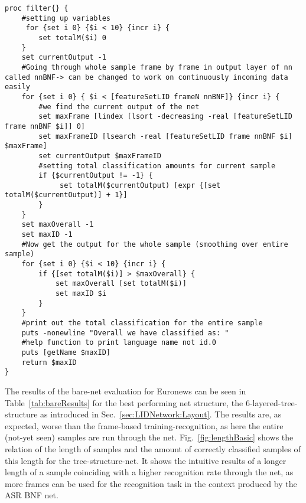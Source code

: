 \begin{lstlisting}[label=lst:basic,caption=Most basic filter employed to smooth output]
proc filter{} {
    #setting up variables
     for {set i 0} {$i < 10} {incr i} {
        set totalM($i) 0
    }
    set currentOutput -1
    #Going through whole sample frame by frame in output layer of nn called nnBNF-> can be changed to work on continuously incoming data easily
    for {set i 0} { $i < [featureSetLID frameN nnBNF]} {incr i} {
        #we find the current output of the net
        set maxFrame [lindex [lsort -decreasing -real [featureSetLID frame nnBNF $i]] 0]
        set maxFrameID [lsearch -real [featureSetLID frame nnBNF $i] $maxFrame]
        set currentOutput $maxFrameID
        #setting total classification amounts for current sample
        if {$currentOutput != -1} {
             set totalM($currentOutput) [expr {[set totalM($currentOutput)] + 1}]
        }
    }
    set maxOverall -1
    set maxID -1
    #Now get the output for the whole sample (smoothing over entire sample)
    for {set i 0} {$i < 10} {incr i} {
        if {[set totalM($i)] > $maxOverall} {
            set maxOverall [set totalM($i)]
            set maxID $i
        }
    }
    #print out the total classification for the entire sample
    puts -nonewline "Overall we have classified as: "
    #help function to print language name not id.0
    puts [getName $maxID]
    return $maxID
}
\end{lstlisting}


The results of the bare-net evaluation for Euronews can be seen in Table~\ref{tab:bareResults} for the best performing net structure, the 6-layered-tree-structure as introduced in Sec.~\ref{sec:LIDNetwork:Layout}. The results are, as expected, worse than the frame-based training-recognition, as here the entire (not-yet seen) samples are run through the net.  Fig.~\ref{fig:lengthBasic} shows the relation of the length of samples and the amount of correctly classified samples of this length for the tree-structure-net. It shows the intuitive results of a longer length of a sample coinciding with a higher recognition rate through the net, as more frames can be used for the recognition task in the context produced by the ASR BNF net.

